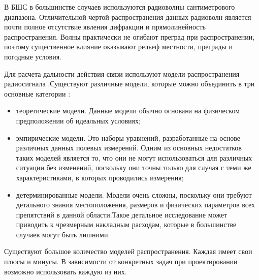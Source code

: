 


В БШС в большинстве случаев используются радиоволны сантиметрового диапазона. Отличительной чертой распространения данных радиоволн  является почти полное отсутствие явления дифракции и прямолинейность распространения. Волны практически не огибают преград при распространении, поэтому существенное влияние оказывают рельеф местности, преграды и погодные условия. 

Для расчета дальности действия связи используют модели распространения радиосигнала \cite{ElChall2019, Zhang2021, Caso2015, Kang2020}.Существуют различные модели, которые можно объединить в три основные категории \cite{Oni2017}:
  \begin{itemize}
    \item теоретические модели. Данные модели обычно основана на физическом предположении об идеальных условиях;
    \item эмпирические модели. Это наборы уравнений, разработанные на основе различных данных полевых измерений. Одним из основных недостатков таких моделей является то, что они не могут использоваться для различных ситуации без изменений, поскольку они точны только для случая с теми же характеристиками, в которых проводились измерения;
    \item детерминированные модели. Модели очень сложны, поскольку они требуют детального знания местоположения, размеров и физических параметров всех препятствий в данной области.Такое детальное исследование может приводить к чрезмерным накладным расходам, которые в большинстве случаев могут быть лишними.
  \end{itemize}

Существуют большое количество моделей распространения. Каждая имеет свои плюсы и минусы. В зависимости от конкретных задач при проектировании возможно использовать каждую из них. 

